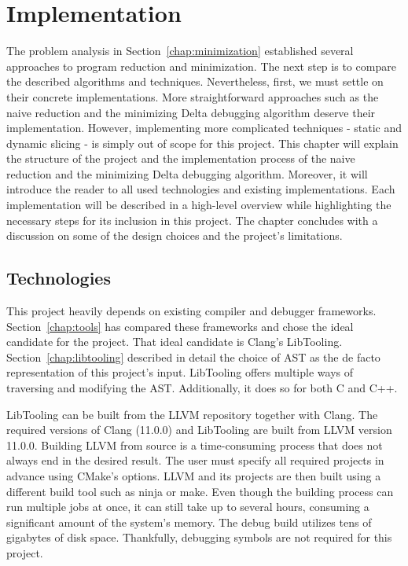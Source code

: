 \chapter{Implementation}\label{chap:implementation}

The problem analysis in Section~\ref{chap:minimization} established several 
approaches to program reduction and minimization. 
The next step is to compare the described algorithms and techniques. 
Nevertheless, first, we must settle on their concrete implementations. 
More straightforward approaches such as the naive reduction and 
the minimizing Delta debugging algorithm deserve their implementation. 
However, implementing more complicated techniques - static and dynamic 
slicing - is simply out of scope for this project.
This chapter will explain the structure of the project and the implementation 
process of the naive reduction and the minimizing Delta debugging algorithm. 
Moreover, it will introduce the reader to all used technologies and existing 
implementations. 
Each implementation will be described in a high-level overview while 
highlighting the necessary steps for its inclusion in this project. 
The chapter concludes with a discussion on some of the design choices and 
the project's limitations.

\section{Technologies}

This project heavily depends on existing compiler and debugger frameworks. 
Section~\ref{chap:tools} has compared these frameworks and chose the ideal 
candidate for the project. 
That ideal candidate is Clang's LibTooling. 
Section~\ref{chap:libtooling} described in detail the choice of AST as 
the de facto representation of this project's input. 
LibTooling offers multiple ways of traversing and modifying the AST. 
Additionally, it does so for both C and C++.

LibTooling can be built from the LLVM repository together with Clang.
The required versions of Clang (11.0.0) and LibTooling are built from LLVM 
version 11.0.0.
Building LLVM from source is a time-consuming process that does not always 
end in the desired result.
The user must specify all required projects in advance using CMake's options.
LLVM and its projects are then built using a different build tool such as 
ninja or make.
Even though the building process can run multiple jobs at once, it can still 
take up to several hours, consuming a significant amount of the system's 
memory.
The debug build utilizes tens of gigabytes of disk space.
Thankfully, debugging symbols are not required for this project.

